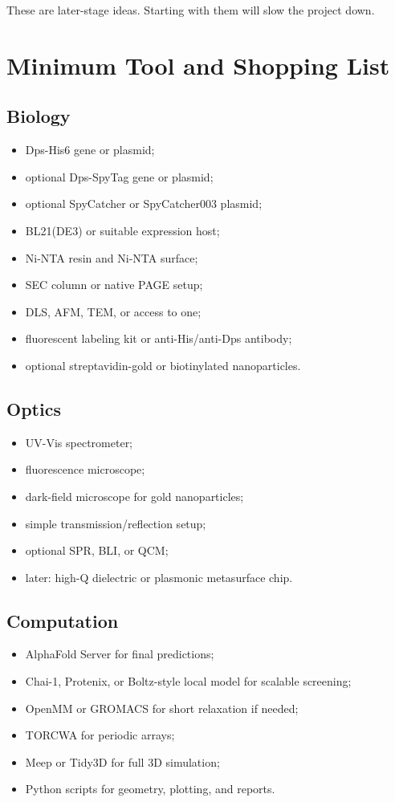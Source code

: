 \documentclass[11pt]{article}
\newcommand{\af}{AlphaFold}
\begin{document}
These are later-stage ideas. Starting with them will slow the project down.

\section{Minimum Tool and Shopping List}

\subsection{Biology}

\begin{itemize}
\item Dps-His6 gene or plasmid;
\item optional Dps-SpyTag gene or plasmid;
\item optional SpyCatcher or SpyCatcher003 plasmid;
\item BL21(DE3) or suitable expression host;
\item Ni-NTA resin and Ni-NTA surface;
\item SEC column or native PAGE setup;
\item DLS, AFM, TEM, or access to one;
\item fluorescent labeling kit or anti-His/anti-Dps antibody;
\item optional streptavidin-gold or biotinylated nanoparticles.
\end{itemize}

\subsection{Optics}

\begin{itemize}
\item UV-Vis spectrometer;
\item fluorescence microscope;
\item dark-field microscope for gold nanoparticles;
\item simple transmission/reflection setup;
\item optional SPR, BLI, or QCM;
\item later: high-Q dielectric or plasmonic metasurface chip.
\end{itemize}

\subsection{Computation}

\begin{itemize}
\item \af{} Server for final predictions;
\item Chai-1, Protenix, or Boltz-style local model for scalable screening;
\item OpenMM or GROMACS for short relaxation if needed;
\item TORCWA for periodic arrays;
\item Meep or Tidy3D for full 3D simulation;
\item Python scripts for geometry, plotting, and reports.
\end{itemize}
\end{document}
